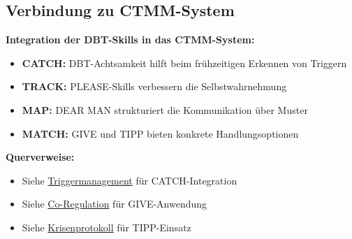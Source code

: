 \subsection{Verbindung zu CTMM-System}

\begin{ctmmPurpleBox}[title=DBT-Skills im CTMM-Kontext]

\textbf{Integration der DBT-Skills in das CTMM-System:}

\begin{itemize}
    \item \textbf{CATCH:} DBT-Achtsamkeit hilft beim frühzeitigen Erkennen von Triggern
    \item \textbf{TRACK:} PLEASE-Skills verbessern die Selbstwahrnehmung
    \item \textbf{MAP:} DEAR MAN strukturiert die Kommunikation über Muster
    \item \textbf{MATCH:} GIVE und TIPP bieten konkrete Handlungsoptionen
\end{itemize}

\textbf{Querverweise:}
\begin{itemize}
    \item Siehe \hyperref[sec:triggermanagement]{Triggermanagement} für CATCH-Integration
    \item Siehe \hyperref[sec:co-regulation]{Co-Regulation} für GIVE-Anwendung
    \item Siehe \hyperref[sec:krisenprotokoll]{Krisenprotokoll} für TIPP-Einsatz
\end{itemize}

\end{ctmmPurpleBox}

\newpage
